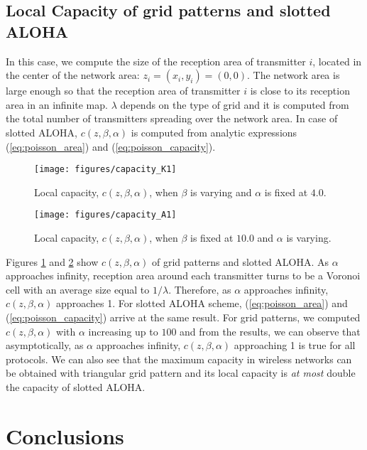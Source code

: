 \documentclass[12pt,english]{article}
\begin{document}
\subsection{Local Capacity of grid patterns and slotted ALOHA}

In this case, we compute the size of the reception area of transmitter $i$, located in the center of the network area: \mbox{$z_{i}=(x_{i},y_{i})=(0,0)$}. The network area is large enough so that the reception area of transmitter $i$ is close to its reception area in an infinite map. $\lambda$ depends on the type of grid and it is computed from the total number of transmitters spreading over the network area. In case of slotted ALOHA, $c(z,\beta,\alpha)$ is computed from analytic expressions (\ref{eq:poisson_area}) and (\ref{eq:poisson_capacity}).

\begin{figure}[!t]
\centering
\texttt{[image: figures/capacity\_K1]}
\caption{Local capacity, $c(z,\beta,\alpha)$, when $\beta$ is varying and $\alpha$ is fixed at $4.0$.
\label{fig:comparison1}}
\end{figure}
\begin{figure}[!t]
\centering
\texttt{[image: figures/capacity\_A1]}
\caption{Local capacity, $c(z,\beta,\alpha)$, when $\beta$ is fixed at $10.0$ and $\alpha$ is varying.
\label{fig:comparison2}}
\end{figure}

Figures \ref{fig:comparison1} and \ref{fig:comparison2} show $c(z,\beta,\alpha)$ of grid patterns and slotted ALOHA. As $\alpha$ approaches infinity, reception area around each transmitter turns to be a Voronoi cell with an average size equal to $1/\lambda$. Therefore, as $\alpha$ approaches infinity, $c(z,\beta,\alpha)$ approaches 1. For slotted ALOHA scheme, (\ref{eq:poisson_area}) and (\ref{eq:poisson_capacity}) arrive at the same result. For grid patterns, we computed $c(z,\beta,\alpha)$ with $\alpha$ increasing up to $100$ and from the results, we can observe that asymptotically, as $\alpha$ approaches infinity, $c(z,\beta,\alpha)$ approaching 1 is true for all protocols. We can also see that the maximum capacity in wireless networks can be obtained with triangular grid pattern and its local capacity is {\it at most} double the capacity of slotted ALOHA.

\section{Conclusions}
\label{sec:conclude}
\end{document}
